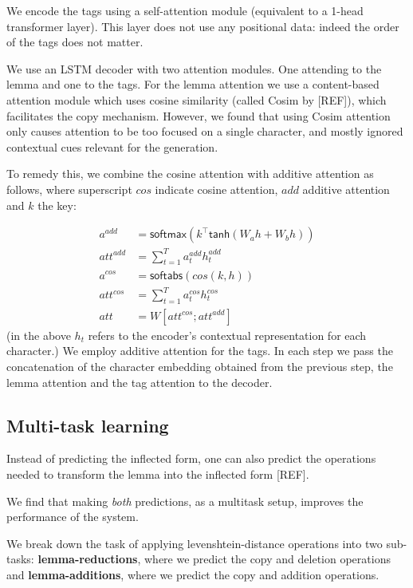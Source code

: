 \documentclass[11pt,a4paper]{article}
\begin{document}
We encode the tags using a self-attention module (equivalent to a 1-head transformer layer).
This layer does not use any positional data: indeed the order of the tags does not matter.

We use an LSTM decoder with two attention modules. One attending to
the lemma and one to the tags. For the lemma attention we use a
content-based attention module which uses cosine similarity (called
Cosim by [REF]), which facilitates the copy mechanism.  However, we
found that using Cosim attention only causes attention to be too
focused on a single character, and mostly ignored contextual cues
relevant for the generation.

To remedy this, we combine the cosine attention with additive
attention as follows, where superscript $cos$ indicate cosine attention,
$add$ additive attention and $k$ the key:

\begin{align*}
	a^{add} & = \mathsf{softmax}(k^\top\mathsf{tanh}(W_ah + W_bh))\\
	att^{add} & = \sum_{t=1}^{T}a_t^{add}h_t^{add}\\
	a^{cos} & = \mathsf{softabs}(cos(k,h))\\
	att^{cos} & = \sum_{t=1}^{T}a_t^{cos}h_t^{cos}\\
	att & = W[att^{cos}; att^{add}]
\end{align*}
(in the above $h_t$ refers to the encoder's contextual representation for each character.)
We employ additive attention for the tags. In each step we pass the
concatenation of the character embedding obtained from the previous
step, the lemma attention and the tag attention to the decoder.


\subsection{Multi-task learning}

Instead of predicting the inflected form, one can also predict the
operations needed to transform the lemma into the inflected form
[REF].

We find that making \emph{both} predictions, as a multitask setup,
improves the performance of the system.

We break down the task of applying levenshtein-distance operations
into two sub-tasks: \textbf{lemma-reductions}, where we predict the copy and
deletion operations and \textbf{lemma-additions}, where we predict the copy and
addition operations. 
\end{document}
